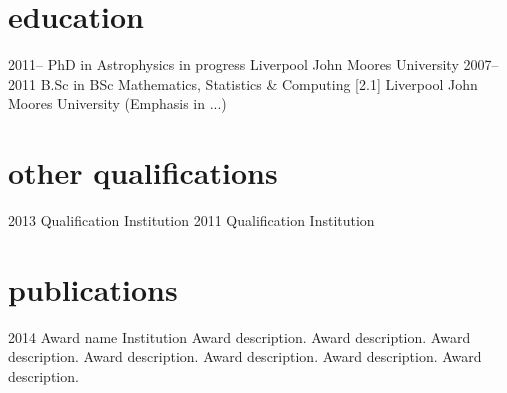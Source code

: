 \documentclass[]{cv-style}          %
\begin{document}
\section{education}

\begin{entrylist}
\entry
{2011--}
{PhD {\normalfont in Astrophysics in progress}}
{Liverpool John Moores University}
{\vspace{-0.3cm}}
\entry
{2007--2011}
{B.Sc {\normalfont in BSc Mathematics, Statistics \& Computing [2.1]}}
{Liverpool John Moores University}
{(Emphasis in ...)}
\end{entrylist}


\section{other qualifications}

\begin{entrylist}
\entry
{2013}
{Qualification}
{Institution}
{\vspace{-0.3cm}}
\entry
{2011}
{Qualification}
{Institution}
{\vspace{-0.3cm}}
\end{entrylist}


\section{publications}

\begin{entrylist}
\entry
{2014}
{Award name}
{Institution}
{Award description. Award description. Award description. Award description. Award description. Award description. Award description. }
\end{entrylist}
\end{document}
